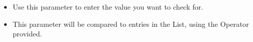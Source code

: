 \begin{itemize}
\item Use this parameter to enter the value you want to check for.
\item This parameter will be compared to entries in the List, using the Operator provided.

\end{itemize}
